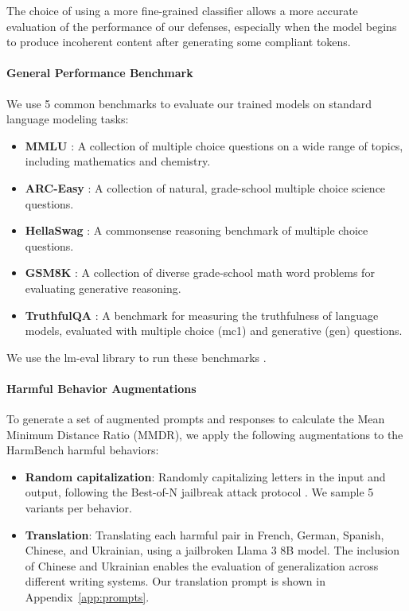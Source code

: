 \documentclass[11pt]{article}
\begin{document}
The choice of using a more fine-grained classifier allows a more accurate evaluation of the performance of our defenses,
especially when the model begins to produce incoherent content after generating some compliant tokens.

\paragraph{General Performance Benchmark}

We use 5 common benchmarks to evaluate our trained models on standard language modeling tasks:

\begin{itemize}[nolistsep]
	\item \textbf{MMLU} \citep{hendrycks2021measuringmassivemultitasklanguage}: A collection of multiple choice questions on a wide range of topics, including mathematics and chemistry.
	\item \textbf{ARC-Easy} \citep{clark2018thinksolvedquestionanswering}: A collection of natural, grade-school multiple choice science questions.
	\item \textbf{HellaSwag} \citep{zellers2019hellaswagmachinereallyfinish}: A commonsense reasoning benchmark of multiple choice questions.
	\item \textbf{GSM8K} \citep{cobbe2021trainingverifierssolvemath}: A collection of diverse grade-school math word problems for evaluating generative reasoning.
    \item \textbf{TruthfulQA} \citep{lin2022truthfulqameasuringmodelsmimic}: A benchmark for measuring the truthfulness of language models, evaluated with multiple choice (mc1) and generative (gen) questions.
\end{itemize}


We use the lm-eval library to run these benchmarks \citep{eval-harness}.


\paragraph{Harmful Behavior Augmentations}
To generate a set of augmented prompts and responses to calculate the Mean Minimum Distance Ratio (MMDR), we apply the following augmentations to the HarmBench harmful behaviors:
\begin{itemize}[nolistsep]
	\item \textbf{Random capitalization}: Randomly capitalizing letters in the input and output, following the Best-of-N jailbreak attack protocol \citep{hughes2024bestofnjailbreaking}. We sample 5 variants per behavior.
	\item \textbf{Translation}: Translating each harmful pair in French, German, Spanish, Chinese, and Ukrainian, using a jailbroken Llama 3 8B model. The inclusion of Chinese and Ukrainian enables the evaluation of generalization across different writing systems. Our translation prompt is shown in Appendix~\ref{app:prompts}.
\end{itemize}
\end{document}
